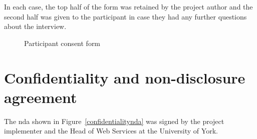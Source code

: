 \documentclass[draft]{scrartcl}
\let\stdsection\section
\renewcommand\section{\clearpage\stdsection}
\begin{document}
In each case, the top half of the form was retained by the project author and
the second half was given to the participant in case they had any further
questions about the interview.

\begin{figure}
  \begin{center}
  \end{center}
  \caption{Participant consent form}
  \label{participantconsent}
\end{figure}

\stdsection{Confidentiality and non-disclosure agreement}
\label{sec:nda}

The \gls{nda} shown in Figure~\ref{confidentialitynda} was signed by the
project implementer and the Head of Web Services at the University of York.
\end{document}
